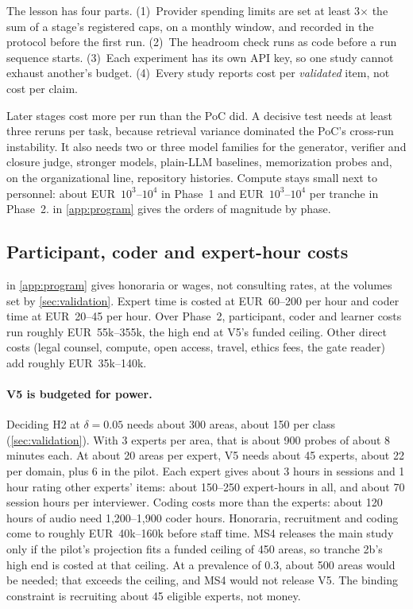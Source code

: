 \evint{} The lesson has four parts. (1)~Provider spending limits are set at least 3$\times$ the sum
of a stage's registered caps, on a monthly window, and recorded in the protocol before the first
run. (2)~The headroom check runs as code before a run sequence starts. (3)~Each experiment has its
own API key, so one study cannot exhaust another's budget. (4)~Every study reports cost per
\emph{validated} item, not cost per claim.

Later stages cost more per run than the PoC did. A decisive test needs at least three reruns per
task, because retrieval variance dominated the PoC's cross-run instability. It also needs two or
three model families for the generator, verifier and closure judge, stronger models, plain-LLM
baselines, memorization probes and, on the organizational line, repository histories.
Compute stays small next to personnel: about EUR~$10^3$--$10^4$ in Phase~1 and
EUR~$10^3$--$10^4$ per tranche in Phase~2.  in \cref{app:program}
gives the orders of magnitude by phase.


\subsection{Participant, coder and expert-hour costs}

 in \cref{app:program} gives honoraria or wages, not
consulting rates, at the volumes set by \cref{sec:validation}. Expert time is costed at EUR~60--200 per hour and coder time at
EUR~20--45 per hour. Over Phase~2, participant, coder and learner costs run roughly EUR~55k--355k,
the high end at V5's funded ceiling. Other direct costs (legal counsel, compute, open access,
travel, ethics fees, the gate reader) add roughly EUR~35k--140k.

\paragraph{V5 is budgeted for power.} \evint{} Deciding H2 at $\delta = 0.05$ needs about 300
areas, about 150 per class (\cref{sec:validation}). With 3 experts per area, that is about 900
probes of about 8 minutes each. At about 20 areas per expert, V5 needs about 45 experts, about 22
per domain, plus 6 in the pilot. Each expert gives about 3 hours in sessions and 1 hour rating
other experts' items: about 150--250 expert-hours in all, and about 70 session hours per
interviewer. Coding costs more than the experts: about 120 hours of audio need 1,200--1,900 coder
hours. Honoraria, recruitment and coding come to roughly EUR~40k--160k before staff time. MS4
releases the main study only if the pilot's projection fits a funded ceiling of 450 areas, so
tranche 2b's high end is costed at that ceiling. At a prevalence of 0.3, about 500 areas would be
needed; that exceeds the ceiling, and MS4 would not release V5. The binding constraint is
recruiting about 45 eligible experts, not money.


